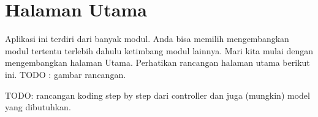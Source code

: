 \chapter{Halaman Utama}
Aplikasi ini terdiri dari banyak modul. Anda bisa memilih mengembangkan modul tertentu terlebih dahulu ketimbang modul lainnya. Mari kita mulai dengan mengembangkan halaman Utama. Perhatikan rancangan halaman utama berikut ini.
TODO : gambar rancangan.

TODO: rancangan koding step by step dari controller dan juga (mungkin) model yang dibutuhkan.